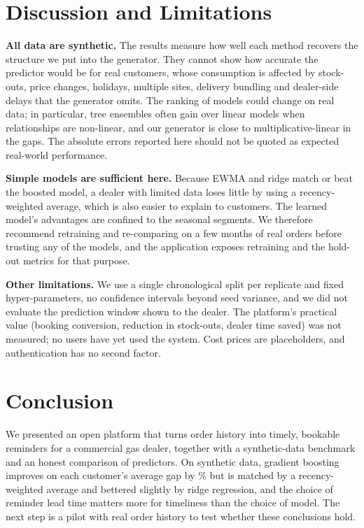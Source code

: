 \documentclass[conference]{IEEEtran}
\begin{document}
\section{Discussion and Limitations}\label{sec:limits}
\textbf{All data are synthetic.} The results measure how well each method recovers the structure we put into the generator. They cannot show how accurate the predictor would be for real customers, whose consumption is affected by stock-outs, price changes, holidays, multiple sites, delivery bundling and dealer-side delays that the generator omits. The ranking of models could change on real data; in particular, tree ensembles often gain over linear models when relationships are non-linear, and our generator is close to multiplicative-linear in the gaps. The absolute errors reported here should not be quoted as expected real-world performance.

\textbf{Simple models are sufficient here.} Because EWMA and ridge match or beat the boosted model, a dealer with limited data loses little by using a recency-weighted average, which is also easier to explain to customers. The learned model's advantages are confined to the seasonal segments. We therefore recommend retraining and re-comparing on a few months of real orders before trusting any of the models, and the application exposes retraining and the hold-out metrics for that purpose.

\textbf{Other limitations.} We use a single chronological split per replicate and fixed hyper-parameters, no confidence intervals beyond seed variance, and we did not evaluate the prediction window shown to the dealer. The platform's practical value (booking conversion, reduction in stock-outs, dealer time saved) was not measured; no users have yet used the system. Cost prices are placeholders, and authentication has no second factor.

\section{Conclusion}
We presented an open platform that turns order history into timely, bookable reminders for a commercial gas dealer, together with a synthetic-data benchmark and an honest comparison of predictors. On synthetic data, gradient boosting improves on each customer's average gap by \GainOwn\% but is matched by a recency-weighted average and bettered slightly by ridge regression, and the choice of reminder lead time matters more for timeliness than the choice of model. The next step is a pilot with real order history to test whether these conclusions hold.
\end{document}
